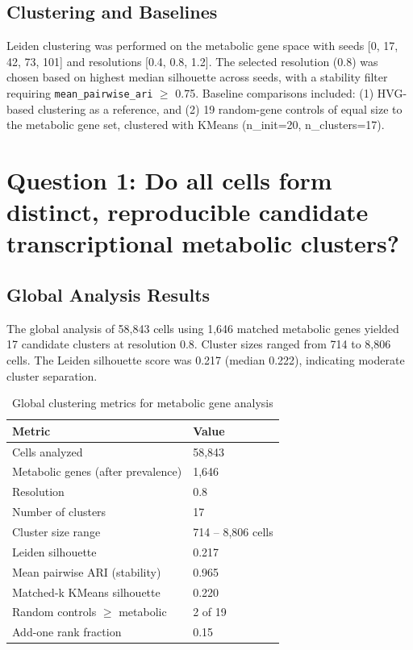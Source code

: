 \documentclass[11pt,a4paper]{article}
\begin{document}
\subsection{Clustering and Baselines}
Leiden clustering was performed on the metabolic gene space with seeds [0, 17, 42, 73, 101] and resolutions [0.4, 0.8, 1.2]. The selected resolution (0.8) was chosen based on highest median silhouette across seeds, with a stability filter requiring \texttt{mean\_pairwise\_ari} $\ge$ 0.75. Baseline comparisons included: (1) HVG-based clustering as a reference, and (2) 19 random-gene controls of equal size to the metabolic gene set, clustered with KMeans (n\_init=20, n\_clusters=17).

\section{Question 1: Do all cells form distinct, reproducible candidate transcriptional metabolic clusters?}

\subsection{Global Analysis Results}
The global analysis of 58,843 cells using 1,646 matched metabolic genes yielded 17 candidate clusters at resolution 0.8. Cluster sizes ranged from 714 to 8,806 cells. The Leiden silhouette score was 0.217 (median 0.222), indicating moderate cluster separation.

\begin{table}[h!]
\centering
\caption{Global clustering metrics for metabolic gene analysis}
\label{tab:global_metrics}
\begin{tabular}{ll}
\toprule
Metric & Value \\
\midrule
Cells analyzed & 58,843 \\
Metabolic genes (after prevalence) & 1,646 \\
Resolution & 0.8 \\
Number of clusters & 17 \\
Cluster size range & 714 -- 8,806 cells \\
Leiden silhouette & 0.217 \\
Mean pairwise ARI (stability) & 0.965 \\
Matched-k KMeans silhouette & 0.220 \\
Random controls $\ge$ metabolic & 2 of 19 \\
Add-one rank fraction & 0.15 \\
\bottomrule
\end{tabular}
\end{table}
\end{document}

